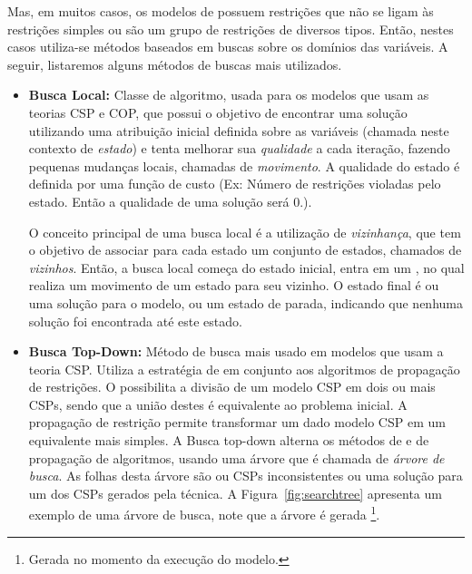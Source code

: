 Mas, em muitos casos, os modelos de \pr{} possuem restrições que não se
ligam às restrições simples ou são um grupo de restrições de diversos
tipos. Então, nestes casos utiliza-se métodos baseados em buscas sobre
os domínios das variáveis. A seguir, listaremos alguns métodos de buscas
mais utilizados.

\begin{itemize}

    \item{\textbf{Busca Local:} Classe de algoritmo, usada para os
        modelos que usam as teorias CSP e COP, que possui o objetivo de
        encontrar uma solução utilizando uma atribuição inicial definida
        sobre as variáveis (chamada neste contexto de \textit{estado}) e
        tenta melhorar sua \textit{qualidade} a cada iteração, fazendo
        pequenas mudanças locais, chamadas de \textit{movimento}. A
        qualidade do estado é definida por uma função de custo (Ex:
        Número de restrições violadas pelo estado.  Então a qualidade de
        uma solução será 0.).

        O conceito principal de uma busca local é a utilização de
        \textit{vizinhança}, que tem o objetivo de associar para cada
        estado um conjunto de estados, chamados de \textit{vizinhos}.
        Então, a busca local começa do estado inicial, entra em um
        , no qual realiza um movimento de um estado para seu
        vizinho. O estado final é ou uma solução para o modelo, ou um estado
        de parada, indicando que nenhuma solução foi encontrada até este
        estado.}

    \item{\textbf{Busca Top-Down:} Método de busca mais usado em
        modelos que usam a teoria CSP\@. Utiliza a estratégia de
         em conjunto aos algoritmos de propagação de
        restrições. O  possibilita a divisão de um
        modelo CSP em dois ou mais CSPs, sendo que a união destes é
        equivalente ao problema inicial. A propagação de restrição
        permite transformar um dado modelo CSP em um equivalente mais
        simples. A Busca top-down alterna os métodos de 
        e de propagação de algoritmos, usando uma árvore que é chamada
        de \textit{árvore de busca}. As folhas desta árvore são ou CSPs
        inconsistentes ou uma solução para um dos CSPs gerados pela
        técnica. A Figura~\ref{fig:searchtree} apresenta um exemplo de
        uma árvore de busca, note que a árvore é gerada
        \footnote{Gerada no momento da execução do
        modelo.}.

}
\end{itemize}
